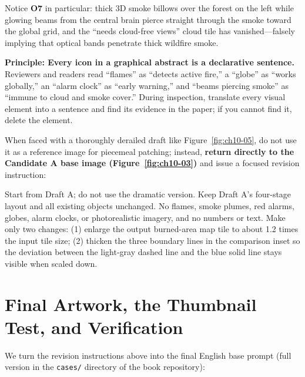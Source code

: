 Notice \textbf{O7} in particular: thick 3D smoke billows over the forest on the left while glowing beams from the central brain pierce straight through the smoke toward the global grid, and the ``needs cloud-free views'' cloud tile has vanished---falsely implying that optical bands penetrate thick wildfire smoke.

\begin{BookNote}
\textbf{Principle: Every icon in a graphical abstract is a declarative sentence.} Reviewers and readers read ``flames'' as ``detects active fire,'' a ``globe'' as ``works globally,'' an ``alarm clock'' as ``early warning,'' and ``beams piercing smoke'' as ``immune to cloud and smoke cover.'' During inspection, translate every visual element into a sentence and find its evidence in the paper; if you cannot find it, delete the element.
\end{BookNote}

When faced with a thoroughly derailed draft like Figure~\ref{fig:ch10-05}, do not use it as a reference image for piecemeal patching; instead, \textbf{return directly to the Candidate A base image (Figure~\ref{fig:ch10-03})} and issue a focused revision instruction:

\begin{Prompt}
Start from Draft A; do not use the dramatic version. Keep Draft A's four-stage
layout and all existing objects unchanged.
No flames, smoke plumes, red alarms, globes, alarm clocks, or photorealistic
imagery, and no numbers or text.
Make only two changes: (1) enlarge the output burned-area map tile to about 1.2
times the input tile size; (2) thicken the three boundary lines in the
comparison inset so the deviation between the light-gray dashed line and the
blue solid line stays visible when scaled down.
\end{Prompt}

\section{Final Artwork, the Thumbnail Test, and Verification}

We turn the revision instructions above into the final English base prompt (full version in the \texttt{cases/} directory of the book repository):


